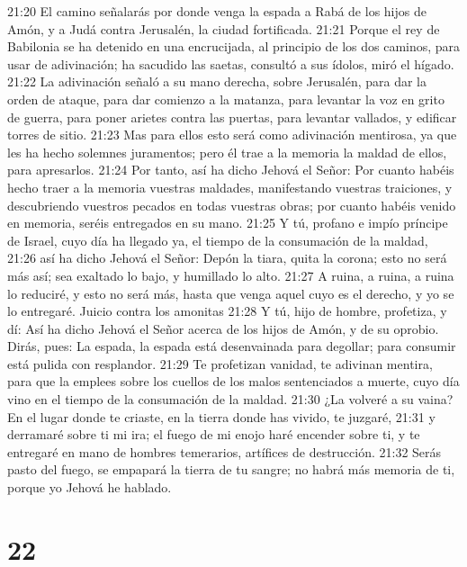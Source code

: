 21:20 El camino señalarás por donde venga la espada a Rabá de los hijos de Amón, y a Judá contra Jerusalén, la ciudad fortificada.  
21:21 Porque el rey de Babilonia se ha detenido en una encrucijada, al principio de los dos caminos, para usar de adivinación; ha sacudido las saetas, consultó a sus ídolos, miró el hígado.  
21:22 La adivinación señaló a su mano derecha, sobre Jerusalén, para dar la orden de ataque, para dar comienzo a la matanza, para levantar la voz en grito de guerra, para poner arietes contra las puertas, para levantar vallados, y edificar torres de sitio.  
21:23 Mas para ellos esto será como adivinación mentirosa, ya que les ha hecho solemnes juramentos; pero él trae a la memoria la maldad de ellos, para apresarlos.  
21:24 Por tanto, así ha dicho Jehová el Señor: Por cuanto habéis hecho traer a la memoria vuestras maldades, manifestando vuestras traiciones, y descubriendo vuestros pecados en todas vuestras obras; por cuanto habéis venido en memoria, seréis entregados en su mano.  
21:25 Y tú, profano e impío príncipe de Israel, cuyo día ha llegado ya, el tiempo de la consumación de la maldad,  
21:26 así ha dicho Jehová el Señor: Depón la tiara, quita la corona; esto no será más así; sea exaltado lo bajo, y humillado lo alto.  
21:27 A ruina, a ruina, a ruina lo reduciré, y esto no será más, hasta que venga aquel cuyo es el derecho, y yo se lo entregaré.  
Juicio contra los amonitas  
21:28 Y tú, hijo de hombre, profetiza, y dí: Así ha dicho Jehová el Señor acerca de los hijos de Amón,  y de su oprobio. Dirás, pues: La espada, la espada está desenvainada para degollar; para consumir está pulida con resplandor.  
21:29 Te profetizan vanidad, te adivinan mentira, para que la emplees sobre los cuellos de los malos sentenciados a muerte, cuyo día vino en el tiempo de la consumación de la maldad.  
21:30 ¿La volveré a su vaina? En el lugar donde te criaste, en la tierra donde has vivido, te juzgaré,  
21:31 y derramaré sobre ti mi ira; el fuego de mi enojo haré encender sobre ti, y te entregaré en mano de hombres temerarios, artífices de destrucción.  
21:32 Serás pasto del fuego, se empapará la tierra de tu sangre; no habrá más memoria de ti, porque yo Jehová he hablado.  

\chapter{22}

